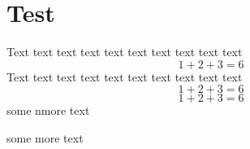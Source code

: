 \documentclass[12pt,a4paper]{mwrep}
\begin{document}
\chapter{Test}

Text text text text text text text text text text
\begin{equation}
	1 + 2 + 3 = 6
\end{equation}
Text text text text text text text text text text
\begin{equation}
	1 + 2 + 3 = 6
\end{equation}
\begin{equation}
	1 + 2 + 3 = 6
\end{equation}
some nmore text
\par
some more text
\end{document}
